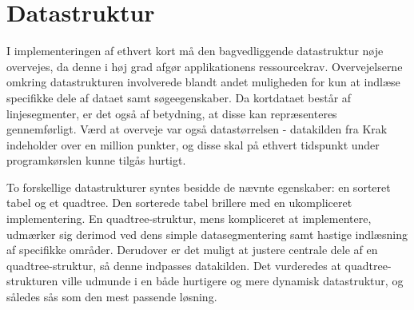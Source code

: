 \section{Datastruktur}
\label{datastruktur}
I implementeringen af ethvert kort må den bagvedliggende datastruktur nøje overvejes, da denne i høj grad afgør applikationens ressourcekrav. Overvejelserne omkring datastrukturen involverede blandt andet muligheden for kun at indlæse specifikke dele af dataet samt søgeegenskaber. Da kortdataet består af linjesegmenter, er det også af betydning, at disse kan repræsenteres gennemførligt. Værd at overveje var også datastørrelsen - datakilden fra Krak indeholder over en million punkter, og disse skal på ethvert tidspunkt under programkørslen kunne tilgås hurtigt.

To forskellige datastrukturer syntes besidde de nævnte egenskaber: en sorteret tabel og et quadtree. Den sorterede tabel brillere med en ukompliceret implementering. En quadtree-struktur, mens kompliceret at implementere, udmærker sig derimod ved dens simple datasegmentering samt hastige indlæsning af specifikke områder. Derudover er det muligt at justere centrale dele af en quadtree-struktur, så denne indpasses datakilden. Det vurderedes at quadtree-strukturen ville udmunde i en både hurtigere og mere dynamisk datastruktur, og således sås som den mest passende løsning.
